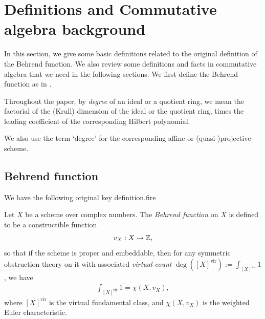 \documentclass[11pt,a4paper,leqno,noamsfonts]{amsart}
\numberwithin{equation}{section}
\begin{document}
\section{Definitions and Commutative algebra background}
 In this section, we give some basic definitions related to the original definition of the Behrend function. We also review some definitions and facts in commutative algebra that we need in the following sections. We first define the Behrend function as in \cite[Definition 3.6, and Introduction]{Beh}.

\begin{definition}\label{def: degree}
    Throughout the paper, by \textit{degree} of an ideal or a quotient ring, we mean the factorial of the (Krull) dimension of the ideal or the  quotient ring, times the leading coefficient of the corresponding Hilbert polynomial.

    We also use the term `degree' for the corresponding affine or (quasi-)projective scheme.
\end{definition}


 
 \subsection{Behrend function}\label{subsection:Behrend} We have the following original key definition.fire
 \begin{definition}\label{Def: Behrend}
    Let $X$ be a scheme over complex numbers. The \textit{Behrend function} on $X$ is defined to be a constructible function 
    \begin{align*}
        v_X:X\to{\mathbb{Z}},
    \end{align*}
    so that if the scheme is proper and embeddable, then for  any symmetric obstruction theory on it with associated  \textit{virtual count} $\deg([X]^{\mathrm{vir}}):=\int_{[X]^{\mathrm{vir}}}1$, we have
\begin{align}\label{eq: WeightedEuler}
    \int_{[X]^{\mathrm{vir}}}1=\chi(X, v_X),
\end{align}
where $[X]^{\mathrm{vir}}$ is the virtual fundamental class, and $\chi(X, v_X)$ is the weighted Euler characteristic.
 \end{definition}
\end{document}
